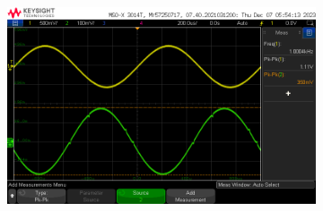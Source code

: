 \documentclass[notitlepage, 12pt]{report}
\begin{document}
\begin{enumerate}
\begin{figure}
\begin{subfigure}{0.3\textwidth}
            \includegraphics[scale=0.2]{images/highvolume.png}
        \end{subfigure}    
    

\end{figure}
\end{enumerate}
\end{document}
